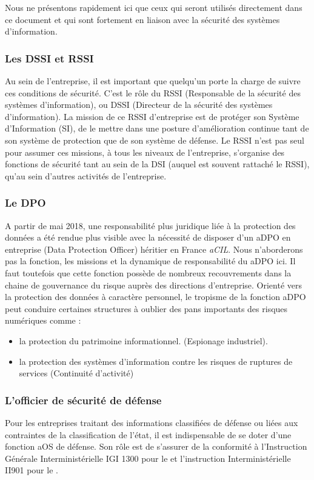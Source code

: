Nous ne présentons rapidement ici que ceux qui seront utilisés directement dans ce document et qui sont fortement en liaison avec la sécurité des systèmes d'information.

\subsubsection{Les DSSI et RSSI}

Au sein de l'entreprise, il est important que quelqu'un porte la charge de suivre ces conditions de sécurité. C'est le rôle du RSSI (Responsable de la sécurité des systèmes d'information), ou DSSI (Directeur de la sécurité des systèmes d'information).
La mission de ce RSSI d'entreprise est de protéger son Système d'Information (SI), de le mettre dans une posture d'amélioration continue tant de son système de protection que de son système de défense. Le RSSI n'est pas seul pour assumer ces missions, à tous les niveaux de l'entreprise, s'organise des fonctions de sécurité tant au sein de la DSI (auquel est souvent rattaché le RSSI), qu'au sein d'autres activités de l'entreprise. 

\subsubsection{Le DPO}

A partir de mai 2018, une responsabilité plus juridique liée à la protection des données a été rendue plus visible avec la nécessité de disposer d'un \gls{aDPO} en entreprise (Data Protection Officer) héritier en France  \textit{\gls{aCIL}}.
Nous n'aborderons pas la fonction, les missions et la dynamique de responsabilité du \gls{aDPO} ici. Il faut toutefois que cette fonction possède de nombreux recouvrements dans la chaine de gouvernance du risque  auprès des directions d'entreprise. Orienté vers la protection des données à caractère personnel, le tropisme de la fonction \gls{aDPO} peut conduire certaines structures à oublier des pans importants des risques numériques comme :

\begin{itemize}
	\item la protection du patrimoine informationnel. (Espionage industriel).
	\item la protection des systèmes d'information contre les risques de ruptures de services (Continuité d'activité)
\end{itemize}

\subsubsection{L'officier de sécurité de défense}
Pour les entreprises traitant des informations classifiées de défense ou liées aux contraintes de la classification de l'état, il est indispensable de se doter d'une fonction \gls{aOS} de défense. Son rôle est de s'assurer de la conformité à l'Instruction Générale Interministérielle IGI 1300 pour le  et l'instruction Interministérielle II901 pour le .

